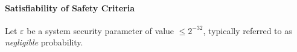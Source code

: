 \documentclass[letterpaper,twocolumn,10pt]{article}
\theoremstyle{definition}
\begin{document}
\begin{appendices}


\paragraph{Satisfiability of Safety Criteria}
Let $\varepsilon$ be a system security parameter of value $\leq 2^{-32}$, typically referred to as \emph{negligible} probability. 


\end{appendices}
\end{document}
